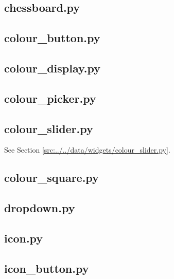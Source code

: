 \documentclass[../main/main.tex]{subfiles}
\begin{document}
\subsection{chessboard.py}

\label{src:data/widgets/chessboard.py}

\subsection{colour\_button.py}

\label{src:data/widgets/colour_button.py}

\subsection{colour\_display.py}

\label{src:data/widgets/colour_display.py}

\subsection{colour\_picker.py}

\label{src:data/widgets/colour_picker.py}

\subsection{colour\_slider.py}
See Section \ref{src:../../data/widgets/colour_slider.py}.

\subsection{colour\_square.py}

\label{src:data/widgets/colour_square.py}

\subsection{dropdown.py}

\label{src:data/widgets/dropdown.py}

\subsection{icon.py}

\label{src:data/widgets/icon.py}

\subsection{icon\_button.py}

\label{src:data/widgets/icon_button.py}
\end{document}

